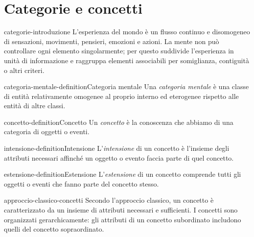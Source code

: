 \documentclass[preview]{standalone}
\begin{document}
\genpage

\section{Categorie e concetti}

\begin{snippet}{categorie-introduzione}
    L'esperienza del mondo è un flusso continuo e disomogeneo di sensazioni,
    movimenti, pensieri, emozioni e azioni. La mente non può controllare ogni
    elemento singolarmente; per questo suddivide l'esperienza in unità di
    informazione e raggruppa elementi associabili per somiglianza, contiguità o
    altri criteri.
\end{snippet}

\begin{snippetdefinition}{categoria-mentale-definition}{Categoria mentale}
    Una \emph{categoria mentale} è una classe di entità relativamente omogenee
    al proprio interno ed eterogenee rispetto alle entità di altre classi.
\end{snippetdefinition}

\begin{snippetdefinition}{concetto-definition}{Concetto}
    Un \emph{concetto} è la conoscenza che abbiamo di una categoria di oggetti o
    eventi.
\end{snippetdefinition}

\begin{snippetdefinition}{intensione-definition}{Intensione}
    L'\emph{intensione} di un concetto è l'insieme degli attributi necessari
    affinché un oggetto o evento faccia parte di quel concetto.
\end{snippetdefinition}

\begin{snippetdefinition}{estensione-definition}{Estensione}
    L'\emph{estensione} di un concetto comprende tutti gli oggetti o eventi che
    fanno parte del concetto stesso.
\end{snippetdefinition}

\begin{snippet}{approccio-classico-concetti}
    Secondo l'approccio classico, un concetto è caratterizzato da un insieme di
    attributi necessari e sufficienti. I concetti sono organizzati
    gerarchicamente: gli attributi di un concetto subordinato includono quelli
    del concetto sopraordinato.
\end{snippet}

\end{document}
